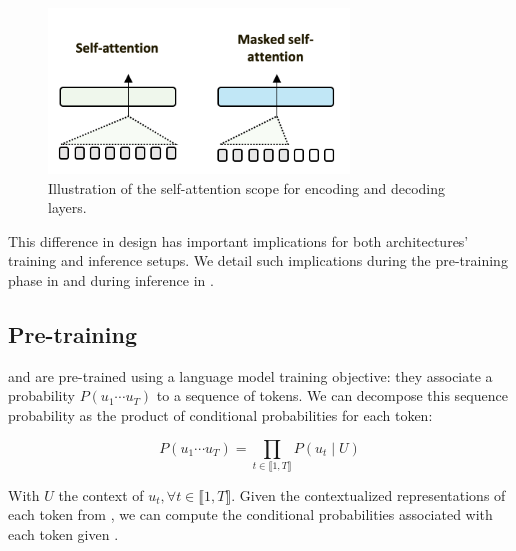 \begin{figure}[htbp]
\begin{center}
\includegraphics[width=8cm]{images/self-attention.png}
\end{center}
\caption{Illustration of the self-attention scope for encoding and decoding layers.}
\end{figure}


This difference in design has important implications for both architectures' training and inference setups. We detail such implications during the pre-training phase in  and during inference in .


\subsection{Pre-training}

\bert and \gpt are pre-trained using a language model training objective: they associate a probability $P(u_1 \cdots u_T)$ to a sequence of tokens. We can decompose this sequence probability as the product of conditional probabilities for each token:

\begin{equation}
    P(u_1 \cdots u_T) = \prod_{t \in \llbracket 1, T \rrbracket} P\left(u_t \middle| U \right)
\end{equation}

With $U$ the context of $u_t, \forall t \in \llbracket 1, T \rrbracket$. Given the contextualized representations of each token from , we can compute the conditional probabilities associated with each token given .

